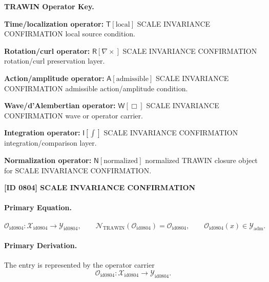 \par\vspace{0.45\baselineskip}
\noindent\begin{minipage}[t]{\linewidth}
\begingroup
\small
\raggedright
\textbf{TRAWIN Operator Key.}\par
\noindent\textbf{Time/localization operator:} $\mathsf{T}\!\left[\mathrm{local}\right]$ SCALE INVARIANCE CONFIRMATION local source condition.\par
\noindent\textbf{Rotation/curl operator:} $\mathsf{R}\!\left[\nabla\times\right]$ SCALE INVARIANCE CONFIRMATION rotation/curl preservation layer.\par
\noindent\textbf{Action/amplitude operator:} $\mathsf{A}\!\left[\mathrm{admissible}\right]$ SCALE INVARIANCE CONFIRMATION admissible action/amplitude condition.\par
\noindent\textbf{Wave/d'Alembertian operator:} $\mathsf{W}\!\left[\Box\right]$ SCALE INVARIANCE CONFIRMATION wave or operator carrier.\par
\noindent\textbf{Integration operator:} $\mathsf{I}\!\left[\int\right]$ SCALE INVARIANCE CONFIRMATION integration/comparison layer.\par
\noindent\textbf{Normalization operator:} $\mathsf{N}\!\left[\mathrm{normalized}\right]$ normalized TRAWIN closure object for SCALE INVARIANCE CONFIRMATION.\par
\endgroup
\end{minipage}

\clearpage
\noindent\textbf{[ID 0804] SCALE INVARIANCE CONFIRMATION}\par
\vspace{0.35em}
\paragraph{Primary Equation.}
\[
\mathcal{O}_{\mathrm{id0804}}:\mathcal{X}_{\mathrm{id0804}}\longrightarrow \mathcal{Y}_{\mathrm{id0804}},\qquad
\mathcal{N}_{\mathrm{TRAWIN}}(\mathcal{O}_{\mathrm{id0804}})=\mathcal{O}_{\mathrm{id0804}},\qquad
\mathcal{O}_{\mathrm{id0804}}(x)\in\mathcal{Y}_{\mathrm{adm}}.
\]

\paragraph{Primary Derivation.} The entry is represented by the operator carrier\[
\mathcal{O}_{\mathrm{id0804}}:\mathcal{X}_{\mathrm{id0804}}\longrightarrow \mathcal{Y}_{\mathrm{id0804}}.
\]

